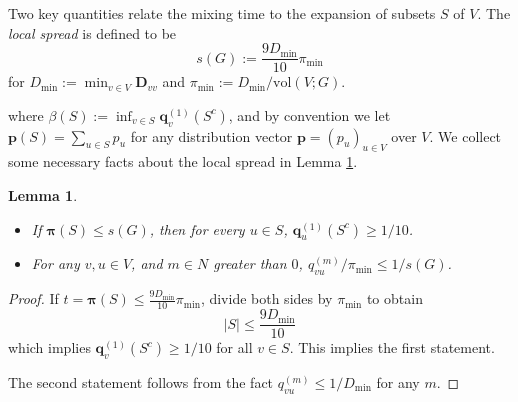 \documentclass{article}
\newcommand{\set}[1]{\left\{#1\right\}}
\newcommand{\vol}{\mathrm{vol}}
\newcommand{\abs}[1]{\left \lvert #1 \right \rvert}
\newcommand{\1}{\mathbf{1}}
\newcommand{\pbf}{\mathbf{p}}
\newcommand{\qbf}{\mathbf{q}}
\newcommand{\pibf}{\bm{\pi}}
\newcommand{\Dbf}{\mathbf{D}}
\theoremstyle{aldenthm}
\newtheorem{lemma}{Lemma}
\begin{document}
Two key quantities relate the mixing time to the expansion of subsets $S$ of $V$. The \emph{local spread} is defined to be
\begin{equation*}
s(G) := \frac{9D_{\min}}{10}\pi_{\min} 
\end{equation*}
for $D_{\min} := \min_{v \in V} \Dbf_{vv}$ and $\pi_{\min} := D_{\min} / \vol(V; G)$.


where $\beta(S) := \inf_{v \in S} \qbf_{v}^{(1)}(S^c)$, and by convention we let $\pbf(S) = \sum_{u \in S} p_u$ for any distribution vector $\pbf = (p_u)_{u \in V}$ over $V$. We collect some necessary facts about the local spread in Lemma \ref{lem: local_spread_G}.
\begin{lemma}
	\label{lem: local_spread_G}
	\begin{itemize}
		\item If $\pibf(S) \leq s(G)$, then for every $u \in S$, $\qbf_u^{(1)}(S^c) \geq 1/10$.
		\item For any $v, u \in V$, and $m \in N$ greater than $0$, $q_{vu}^{(m)}/ \pi_{\min} \leq 1/s(G)$.
	\end{itemize}
	
\end{lemma}

\begin{proof}
	If $t = \pibf(S) \leq \frac{9 D_{\min}}{10} \pi_{\min}$, divide both sides by $\pi_{\min}$ to obtain
	\begin{equation*}
	\abs{S} \leq \frac{9 D_{\min}}{10}
	\end{equation*}
	which implies $\qbf_{v}^{(1)}(S^c) \geq 1/10$ for all $v \in S$. This implies the first statement.
	
	The second statement follows from the fact $q_{vu}^{(m)} \leq 1/D_{\min}$ for any $m$.
\end{proof}
\end{document}
